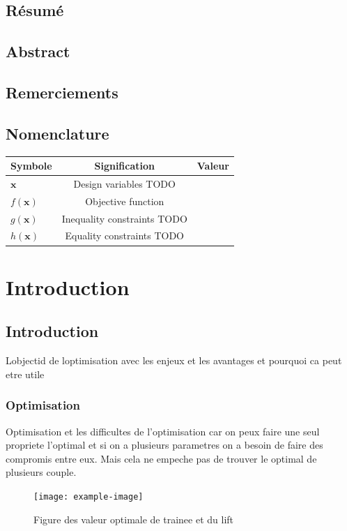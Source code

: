 \documentclass[12pt, a4paper]{book}%
\theoremstyle{definition}
\theoremstyle{remark}
\begin{document}
\section*{Résumé}{
}
\section*{Abstract}{
}
\section*{Remerciements}{
}
\newpage

\tableofcontents
\listoffigures
\listoftables
\newpage

\section*{Nomenclature}{
\begin{table}[H]
    \begin{tabular}{l c c} %
        \toprule
        Symbole & Signification & Valeur \\
        \midrule
        $\bm{x}$ & Design variables TODO& \\
        $f(\bm{x})$ & Objective function & \\
        $g(\bm{x})$ & Inequality constraints TODO& \\
        $h(\bm{x})$ & Equality constraints TODO& \\
        \bottomrule
    \end{tabular}
\end{table}
      
}

\newpage



\newpage    
{}

\chapter{Introduction}
\section{Introduction}
Lobjectid de loptimisation avec les enjeux et les avantages et pourquoi ca peut etre utile
\subsection{Optimisation}
Optimisation et les difficultes de l'optimisation car on peux faire une seul propriete l'optimal et si on a plusieurs parametres on a besoin de faire des compromis entre eux. Mais cela ne empeche pas de trouver le optimal de plusieurs couple. 
\begin{figure}[H]
    \centering
    \texttt{[image: example-image]}
    \caption{Figure des valeur optimale de trainee et du lift}
\end{figure}
\end{document}
